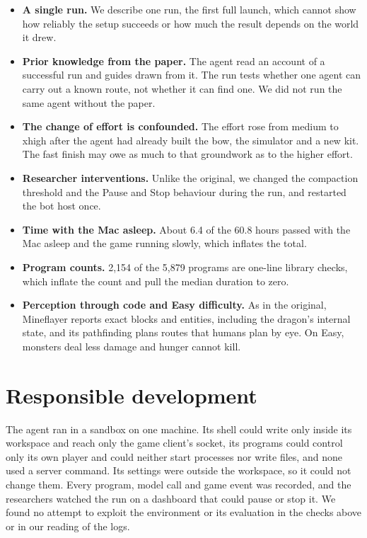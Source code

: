 \documentclass[11pt,a4paper]{article}
\begin{document}
\begin{itemize}
  \item \textbf{A single run.} We describe one run, the first full launch, which cannot show how reliably the setup succeeds or how much the result depends on the world it drew.
  \item \textbf{Prior knowledge from the paper.} The agent read an account of a successful run and guides drawn from it. The run tests whether one agent can carry out a known route, not whether it can find one. We did not run the same agent without the paper.
  \item \textbf{The change of effort is confounded.} The effort rose from medium to xhigh after the agent had already built the bow, the simulator and a new kit. The fast finish may owe as much to that groundwork as to the higher effort.
  \item \textbf{Researcher interventions.} Unlike the original, we changed the compaction threshold and the Pause and Stop behaviour during the run, and restarted the bot host once.
  \item \textbf{Time with the Mac asleep.} About 6.4 of the 60.8 hours passed with the Mac asleep and the game running slowly, which inflates the total.
  \item \textbf{Program counts.} 2,154 of the 5,879 programs are one-line library checks, which inflate the count and pull the median duration to zero.
  \item \textbf{Perception through code and Easy difficulty.} As in the original, Mineflayer reports exact blocks and entities, including the dragon's internal state, and its pathfinding plans routes that humans plan by eye. On Easy, monsters deal less damage and hunger cannot kill.
\end{itemize}

\section{Responsible development}

The agent ran in a sandbox on one machine. Its shell could write only inside its workspace and reach only the game client's socket, its programs could control only its own player and could neither start processes nor write files, and none used a server command. Its settings were outside the workspace, so it could not change them. Every program, model call and game event was recorded, and the researchers watched the run on a dashboard that could pause or stop it. We found no attempt to exploit the environment or its evaluation in the checks above or in our reading of the logs.
\end{document}
